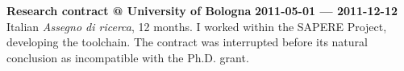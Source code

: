 \halfblankline{}

\textbf{Research contract @ University of Bologna} \hfill \textbf{2011-05-01 --- 2011-12-12}\\
Italian \emph{Assegno di ricerca}, 12 months.
I worked within the SAPERE Project, developing the toolchain.
The contract was interrupted before its natural conclusion as incompatible with the Ph.D. grant.
